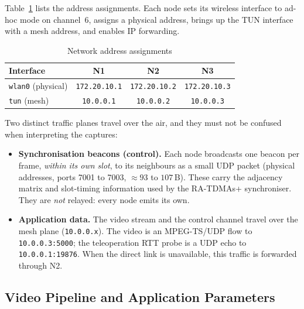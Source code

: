 Table~\ref{tab:netconfig} lists the address assignments. Each node sets its
wireless interface to ad-hoc mode on channel~6, assigns a physical address,
brings up the TUN interface with a mesh address, and enables IP forwarding.

\begin{table}[h]
\centering
\caption{Network address assignments}
\label{tab:netconfig}
\begin{tabular}{lccc}
\toprule
\textbf{Interface} & \textbf{N1} & \textbf{N2} & \textbf{N3} \\
\midrule
\texttt{wlan0} (physical) & \texttt{172.20.10.1} & \texttt{172.20.10.2} & \texttt{172.20.10.3} \\
\texttt{tun} (mesh)       & \texttt{10.0.0.1}    & \texttt{10.0.0.2}    & \texttt{10.0.0.3}    \\
\bottomrule
\end{tabular}
\end{table}

Two distinct traffic planes travel over the air, and they must not be confused
when interpreting the captures:

\begin{itemize}
  \item \textbf{Synchronisation beacons (control).} Each node broadcasts one
  beacon per frame, \emph{within its own slot}, to its neighbours as a small
  UDP packet (physical addresses, ports 7001 to 7003, $\approx 93$ to $107$\,B).
  These carry the adjacency matrix and slot-timing information used by the
  RA-TDMAs+ synchroniser. They are \emph{not} relayed: every node emits its
  own.
  \item \textbf{Application data.} The video stream and the control channel
  travel over the mesh plane (\texttt{10.0.0.x}). The video is an MPEG-TS/UDP
  flow to \texttt{10.0.0.3:5000}; the teleoperation RTT probe is a UDP echo to
  \texttt{10.0.0.1:19876}. When the direct link is unavailable, this traffic
  is forwarded through N2.
\end{itemize}

\subsection{Video Pipeline and Application Parameters}
\label{subsec:video-pipeline}

